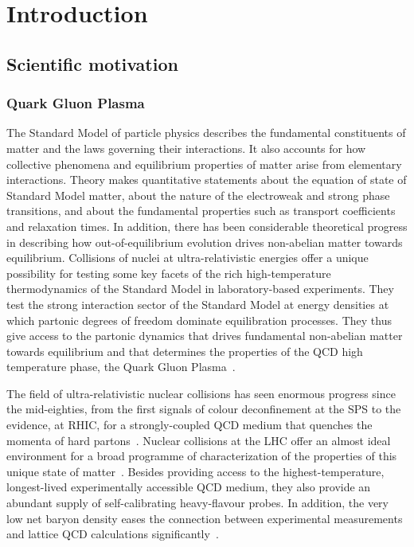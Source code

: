 \chapter{Introduction}
\section{Scientific motivation}
\subsection{Quark Gluon Plasma}
The Standard Model of particle physics describes the fundamental constituents of matter and the laws governing their interactions.
It also accounts for how collective phenomena and equilibrium properties of matter arise from elementary interactions. 
Theory makes quantitative statements about the equation of state of Standard Model matter, about the nature of the electroweak and strong phase transitions, and about the fundamental properties such as transport coefficients and relaxation times.
In addition, there has been considerable theoretical progress in describing how out-of-equilibrium evolution drives non-abelian matter towards equilibrium.
Collisions of nuclei at ultra-relativistic energies offer a unique possibility for testing some key facets of the rich high-temperature thermodynamics of the Standard Model in laboratory-based experiments.
They test the strong interaction sector of the Standard Model at energy densities at which partonic degrees of freedom dominate equilibration processes.
They thus give access to the partonic dynamics that drives fundamental non-abelian matter towards equilibrium and that determines the properties of the QCD high temperature phase, the Quark Gluon Plasma~\cite{wong1994introduction, wikipedia_2021}.

The field of ultra-relativistic nuclear collisions has seen enormous progress since the mid-eighties, from the first signals of colour deconfinement at the SPS to the evidence, at RHIC, for a strongly-coupled QCD medium that quenches the momenta of hard partons~\cite{Reidt:2151986}.
Nuclear collisions at the LHC offer an almost ideal environment for a broad programme of characterization of the properties of this unique state of matter~\cite{Chatrchyan:2011pw}.
Besides providing access to the highest-temperature, longest-lived experimentally accessible QCD medium, they also provide an abundant supply of self-calibrating heavy-flavour probes.
In addition, the very low net baryon density eases the connection between experimental measurements and lattice QCD calculations significantly~\cite{Chatrchyan:2011vh}.

